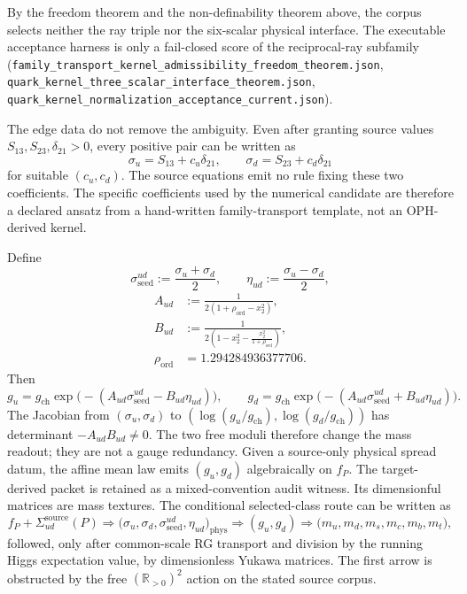 \documentclass[11pt]{article}
\begin{document}
By the freedom theorem and the non-definability theorem above, the corpus selects neither
the ray triple nor the six-scalar physical interface. The executable acceptance harness is
only a fail-closed score of the reciprocal-ray subfamily
(\texttt{family\_transport\_kernel\_admissibility\_freedom\_theorem.json},
\texttt{quark\_kernel\_three\_scalar\_interface\_theorem.json},
\texttt{quark\_kernel\_normalization\_acceptance\_current.json}).

The edge data do not remove the ambiguity. Even after granting source values
\(S_{13},S_{23},\delta_{21}>0\), every positive pair can be written as
\[
\sigma_u=S_{13}+c_u\delta_{21},\qquad
\sigma_d=S_{23}+c_d\delta_{21}
\]
for suitable \((c_u,c_d)\). The source equations emit no rule fixing these two coefficients. The
specific coefficients used by the numerical candidate are therefore a declared ansatz from a
hand-written family-transport template, not an OPH-derived kernel.

Define
\[
\sigma_{\mathrm{seed}}^{ud}:=\frac{\sigma_u+\sigma_d}{2},
\qquad
\eta_{ud}:=\frac{\sigma_u-\sigma_d}{2},
\]
\[
\begin{aligned}
A_{ud}&:=\frac{1}{2(1+\rho_{\mathrm{ord}}-x_2^2)},\\
B_{ud}&:=\frac{1}{2\!\left(1-x_2^2-\frac{x_2^2}{1+\rho_{\mathrm{ord}}}\right)},\\
\rho_{\mathrm{ord}}&=1.294284936377706.
\end{aligned}
\]
Then
\[
g_u
=
g_{\mathrm{ch}}
\exp\!\bigl(-(A_{ud}\sigma_{\mathrm{seed}}^{ud}-B_{ud}\eta_{ud})\bigr),
\qquad
g_d
=
g_{\mathrm{ch}}
\exp\!\bigl(-(A_{ud}\sigma_{\mathrm{seed}}^{ud}+B_{ud}\eta_{ud})\bigr).
\]
The Jacobian from \((\sigma_u,\sigma_d)\) to
\((\log(g_u/g_{\mathrm{ch}}),\log(g_d/g_{\mathrm{ch}}))\) has determinant
\(-A_{ud}B_{ud}\neq0\). The two free moduli therefore change the mass readout; they are not a
gauge redundancy. Given a source-only physical spread datum, the affine mean law emits
\((g_u,g_d)\) algebraically on \(f_P\). The target-derived packet is retained as a mixed-convention
audit witness. Its dimensionful matrices are mass textures. The conditional selected-class route
can be written as
\[
\!f_P+\Sigma_{ud}^{\mathrm{source}}(P)
\Longrightarrow
\bigl(\sigma_u,\sigma_d,\sigma_{\mathrm{seed}}^{ud},\eta_{ud}\bigr)_{\mathrm{phys}}
\Longrightarrow
(g_u,g_d)
\Longrightarrow
\bigl(m_u,m_d,m_s,m_c,m_b,m_t\bigr),
\]
followed, only after common-scale RG transport and division by the running Higgs expectation
value, by dimensionless Yukawa matrices. The first arrow is obstructed by the free
\((\mathbb R_{>0})^2\) action on the stated source corpus.
\end{document}
